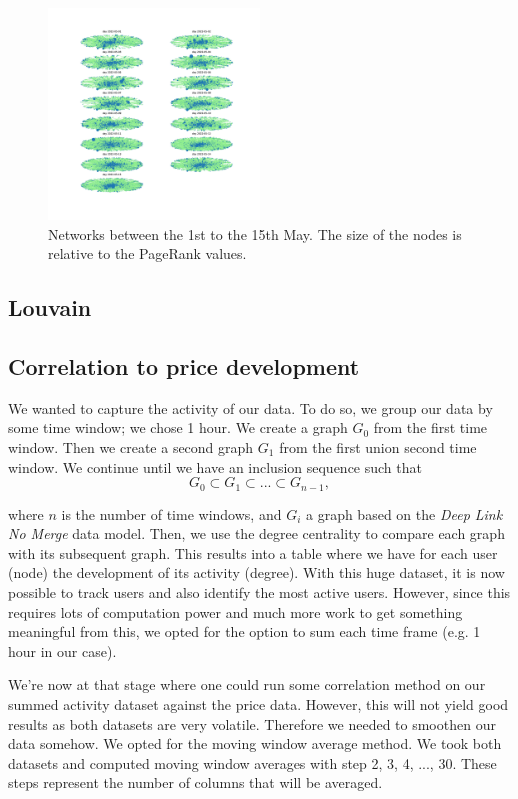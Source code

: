 \begin{figure}[H]
    \centering
    \includegraphics[width=0.5\textwidth]{figures/rank_days.pdf}
    \caption{Networks between the 1st to the 15th May. The size of the nodes is relative to the PageRank values.}
    \label{fig:rankdays}
\end{figure}

\subsection{Louvain}


\subsection{Correlation to price development}

We wanted to capture the activity of our data. To do so, we group our data by some time window; we chose 1 hour. We create a graph $G_0$ from the first time window. Then we create a second graph $G_1$ from the first union second time window. We continue until we have an inclusion sequence such that 
$$ G_0 \subset G_1 \subset  ... \subset G_{n-1},$$

where $n$ is the number of time windows, and $G_i$ a graph based on the \textit{Deep Link No Merge} data model.
Then, we use the degree centrality to compare each graph with its subsequent graph. This results into a table where we have for each user (node) the development of its activity (degree). With this huge dataset, it is now possible to track users and also identify the most active users. However, since this requires lots of computation power and much more work to get something meaningful from this, we opted for the option to sum each time frame (e.g. 1 hour in our case). 

We're now at that stage where one could run some correlation method on our summed activity dataset against the price data. However, this will not yield good results as both datasets are very volatile. Therefore we needed to smoothen our data somehow. We opted for the moving window average method. We took both datasets and computed moving window averages with step 2, 3, 4, ..., 30. These steps represent the number of columns that will be averaged. 

